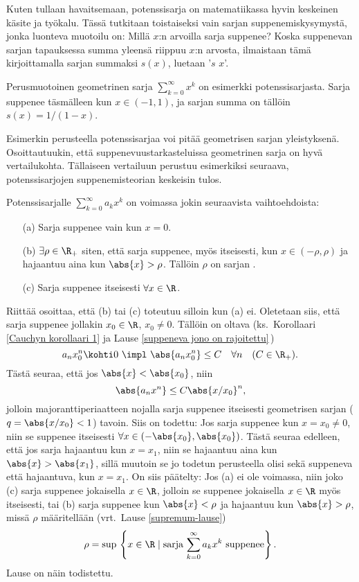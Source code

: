 Kuten tullaan havaitsemaan, potenssisarja on matematiikassa hyvin keskeinen käsite ja työkalu.
Tässä tutkitaan toistaiseksi vain sarjan suppenemiskysymystä, jonka luonteva muotoilu on: Millä
$x$:n arvoilla sarja suppenee? Koska suppenevan sarjan tapauksessa summa yleensä riippuu $x$:n
arvosta, ilmaistaan tämä kirjoittamalla sarjan summaksi $s(x)$, luetaan '$s$ $x$'.
\begin{Exa} Perusmuotoinen geometrinen sarja $\sum_{k=0}^\infty x^k$ on esimerkki 
potenssisarjasta. Sarja suppenee täsmälleen kun $x \in (-1,1)$, ja sarjan summa on tällöin 
$s(x) = 1/(1-x)$. \loppu 
\end{Exa}
Esimerkin perusteella potenssisarjaa voi pitää geometrisen sarjan yleistyksenä. Osoittautuukin,
että suppenevuustarkasteluissa geometrinen sarja on hyvä vertailukohta. Tällaiseen vertailuun 
perustuu esimerkiksi seuraava, potenssisarjojen suppenemisteorian keskeisin tulos.
\begin{Lause}  \label{suppenemissäde}
  Potenssisarjalle
$\sum_{k=0}^\infty a_k x^k$ on voimassa jokin seuraavista vaihtoehdoista:
\begin{itemize}
\item[(a)] Sarja suppenee vain kun $x=0$.
\item[(b)] $\exists \rho\in\R_+$ siten, että sarja suppenee, myös itseisesti, kun 
           $x\in (-\rho,\rho)$ ja hajaantuu aina kun $\abs{x}>\rho$. Tällöin $\rho$ on sarjan
           .
\item[(c)] Sarja suppenee itseisesti $\forall x\in\R$.
\end{itemize}
\end{Lause}
\tod Riittää osoittaa, että (b) tai (c) toteutuu silloin kun (a) ei. Oletetaan siis, että sarja
suppenee jollakin $x_0 \in \R$, $x_0 \neq 0$. Tällöin on oltava (ks.\ Korollaari
\ref{Cauchyn korollaari 1} ja Lause \ref{suppeneva jono on rajoitettu}\,)
\[
a_nx_0^n\kohti 0 \ \impl \ \abs{a_nx_0^n}\leq C\quad \forall n \quad (C\in\R_+).
\]
Tästä seuraa, että jos $\abs{x}<\abs{x_0}$, niin
\[
\abs{a_nx^n}\leq C\abs{x/x_0}^n,
\]
jolloin majoranttiperiaatteen nojalla sarja suppenee itseisesti geometrisen sarjan 
($q=\abs{x/x_0}<1$) tavoin. Siis on todettu: Jos sarja suppenee kun $x=x_0\neq 0$, niin se 
suppenee itseisesti $\forall x\in (-\abs{x_0},\abs{x_0})$. Tästä seuraa edelleen, että jos sarja
hajaantuu kun $x=x_1$, niin se hajaantuu aina kun $\abs{x}>\abs{x_1}$, sillä muutoin se jo 
todetun perusteella olisi sekä suppeneva että hajaantuva, kun $x=x_1$. On siis päätelty: Jos (a)
ei ole voimassa, niin joko (c) sarja suppenee jokaisella $x \in \R$, jolloin se suppenee 
jokaisella $x \in \R$ myös itseisesti, tai (b) sarja suppenee kun $\abs{x} < \rho$ ja hajaantuu
kun $\abs{x} > \rho$, missä $\rho$ määritellään (vrt.\ Lause \ref{supremum-lause})
\[
\rho=\sup\,\left\{x \in \R \mid \text{sarja $\sum_{k=0}^\infty a_k x^k$ suppenee}\right\}.
\]
Lause on näin todistettu. \loppu

